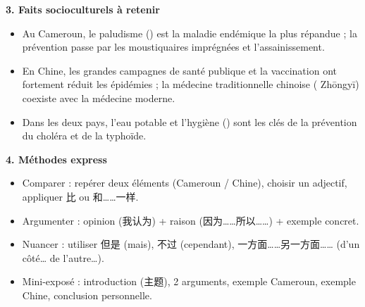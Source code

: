 \documentclass[11pt]{article}
\newcommand{\cle}[1]{{\popxbold\color{popdark}#1}}
\newcommand{\zh}[1]{\ifmmode\text{#1}\else{#1}\fi}
\begin{document}
\begin{bilan}
\textbf{3. Faits socioculturels à retenir}
\begin{itemize}
\item Au Cameroun, le \cle{paludisme} (\zh{疟疾}) est la maladie endémique la plus répandue ; la prévention passe par les moustiquaires imprégnées et l'assainissement.
\item En Chine, les grandes campagnes de santé publique et la vaccination ont fortement réduit les épidémies ; la médecine traditionnelle chinoise (\zh{中医} Zhōngyī) coexiste avec la médecine moderne.
\item Dans les deux pays, l'eau potable et l'hygiène (\zh{卫生}) sont les clés de la prévention du choléra et de la typhoïde.
\end{itemize}

\textbf{4. Méthodes express}
\begin{itemize}
\item \cle{Comparer} : repérer deux éléments (Cameroun / Chine), choisir un adjectif, appliquer 比 ou 和……一样.
\item \cle{Argumenter} : opinion (我认为) + raison (因为……所以……) + exemple concret.
\item \cle{Nuancer} : utiliser 但是 (mais), 不过 (cependant), 一方面……另一方面…… (d'un côté… de l'autre…).
\item \cle{Mini-exposé} : introduction (主题), 2 arguments, exemple Cameroun, exemple Chine, conclusion personnelle.
\end{itemize}
\end{bilan}
\end{document}
